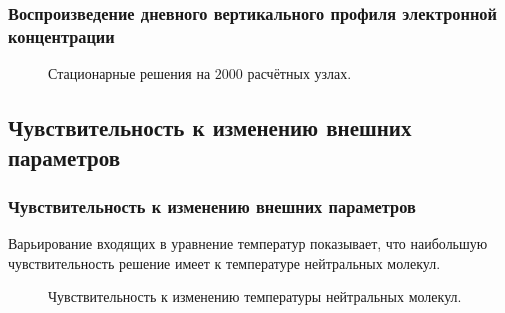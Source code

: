 \documentclass[9pt, apectratio=43,unicode]{beamer}
\begin{document}
\begin{frame}\frametitle{Воспроизведение дневного вертикального профиля электронной концентрации}
\begin{figure}[H]
\caption{Стационарные решения на $2000$ расчётных узлах.}
\end{figure}
\end{frame}


\subsection{Чувствительность к изменению внешних параметров}
\begin{frame}\frametitle{Чувствительность к изменению внешних параметров}

Варьирование входящих в уравнение температур показывает, что наибольшую чувствительность решение имеет к температуре нейтральных молекул.

\begin{figure}
\caption{Чувствительность к изменению температуры нейтральных молекул.}
\end{figure}
\end{frame}
\end{document}
